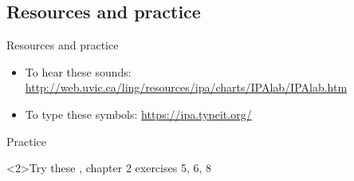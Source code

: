 \documentclass{beamer}
\newcommand{\subtwofive}{Resources and practice}
\begin{document}
    \subsection{\subtwofive}
      \begin{frame}{\subtwofive}
        \begin{block}{}
          \begin{itemize}
            \item To hear these sounds: \url{http://web.uvic.ca/ling/resources/ipa/charts/IPAlab/IPAlab.htm}
            \item To type these symbols: \url{https://ipa.typeit.org/}
          \end{itemize}
        \end{block}
        \begin{block}{Practice}
          \begin{adjustbox}{width=\textwidth}
            
          \end{adjustbox}
        \end{block}
        \begin{block}<2>{Try these}
          \textcite{dawson_language_2016}, chapter 2 exercises 5, 6, 8
        \end{block}
      \end{frame}
\end{document}
